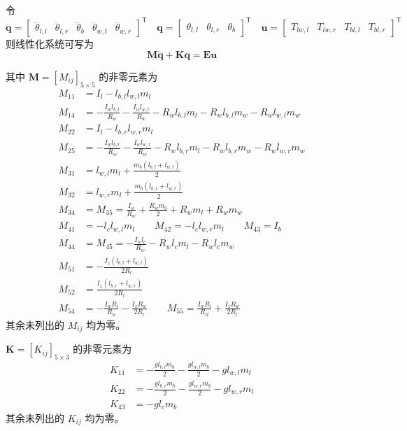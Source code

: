 令
\begin{equation}
  \ddot{\boldsymbol{q}} =
  \begin{bmatrix}
    \ddot{\theta}_{l,l} & \ddot{\theta}_{l,r} & \ddot{\theta}_b &
    \ddot{\theta}_{w,l} & \ddot{\theta}_{w,r}
  \end{bmatrix}^{\mathsf{T}}
  \quad
  \boldsymbol{q} =
  \begin{bmatrix}
    \theta_{l,l} & \theta_{l,r} & \theta_b
  \end{bmatrix}^{\mathsf{T}}
  \quad
  \boldsymbol{u} =
  \begin{bmatrix}
    T_{lw,l} & T_{lw,r} & T_{bl,l} & T_{bl,r}
  \end{bmatrix}^{\mathsf{T}}
\end{equation}
则线性化系统可写为
\begin{equation}
  \boldsymbol{M}\ddot{\boldsymbol{q}}+\boldsymbol{K}\boldsymbol{q}
  =
  \boldsymbol{E}\boldsymbol{u}
\end{equation}

其中 $\boldsymbol{M}=[M_{ij}]_{5\times5}$ 的非零元素为
\begin{align}
  M_{11} &= I_l-l_{b,l}l_{w,l}m_l \\
  M_{14} &=
  -\frac{I_wl_{b,l}}{R_w}
  -\frac{I_wl_{w,l}}{R_w}
  -R_wl_{b,l}m_l
  -R_wl_{b,l}m_w
  -R_wl_{w,l}m_w \\
  M_{22} &= I_l-l_{b,r}l_{w,r}m_l \\
  M_{25} &=
  -\frac{I_wl_{b,r}}{R_w}
  -\frac{I_wl_{w,r}}{R_w}
  -R_wl_{b,r}m_l
  -R_wl_{b,r}m_w
  -R_wl_{w,r}m_w \\
  M_{31} &= l_{w,l}m_l+\frac{m_b(l_{b,l}+l_{w,l})}{2} \\
  M_{32} &= l_{w,r}m_l+\frac{m_b(l_{b,r}+l_{w,r})}{2} \\
  M_{34} &= M_{35}
  = \frac{I_w}{R_w}+\frac{R_wm_b}{2}+R_wm_l+R_wm_w \\
  M_{41} &= -l_cl_{w,l}m_l \qquad
  M_{42} = -l_cl_{w,r}m_l \qquad
  M_{43} = I_b \\
  M_{44} &= M_{45}
  = -\frac{I_wl_c}{R_w}-R_wl_cm_l-R_wl_cm_w \\
  M_{51} &= -\frac{I_z(l_{b,l}+l_{w,l})}{2R_l} \\
  M_{52} &= \frac{I_z(l_{b,r}+l_{w,r})}{2R_l} \\
  M_{54} &= -\frac{I_wR_l}{R_w}-\frac{I_zR_w}{2R_l} \qquad
  M_{55} = \frac{I_wR_l}{R_w}+\frac{I_zR_w}{2R_l}
\end{align}
其余未列出的 $M_{ij}$ 均为零。

$\boldsymbol{K}=[K_{ij}]_{5\times3}$ 的非零元素为
\begin{align}
  K_{11} &= -\frac{gl_{b,l}m_b}{2}-\frac{gl_{w,l}m_b}{2}-gl_{w,l}m_l \\
  K_{22} &= -\frac{gl_{b,r}m_b}{2}-\frac{gl_{w,r}m_b}{2}-gl_{w,r}m_l \\
  K_{43} &= -gl_cm_b
\end{align}
其余未列出的 $K_{ij}$ 均为零。

